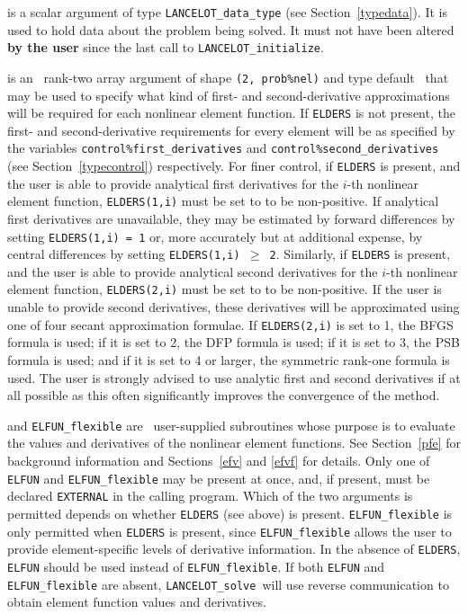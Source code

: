\documentclass{galahad}
\newcommand{\fullpackagename}{LANC\-E\-LOT}
\newcommand{\solver}{{\tt \fullpackagename\_solve}}
\begin{document}
\begin{description}
 is a scalar \intentinout argument of type
{\tt \fullpackagename\_data\_type}
(see Section~\ref{typedata}). It is used to hold data about the problem being
solved. It must not have been altered {\bf by the user} since the last call to
{\tt \fullpackagename\_initialize}.


 is an \optional\ rank-two \intentinout array argument of
shape {\tt (2, prob\%nel)} and type default \integer\,
that may be used to specify what kind of first- and second-derivative
approximations will be required for each nonlinear element function.
If {\tt ELDERS} is not present, the first- and second-derivative
requirements for every element will be as specified by
the variables {\tt control\%first\_derivatives} and
{\tt control\%second\_derivatives} (see Section~\ref{typecontrol})
respectively. For finer control,
if {\tt ELDERS} is present, and the user is able to provide
analytical first derivatives for the $i$-th nonlinear
element function, {\tt ELDERS(1,i)}
must be set to to be non-positive.
If analytical first derivatives are unavailable,
they may be estimated by forward differences by setting
{\tt ELDERS(1,i) = 1} or, more accurately but at additional expense,
by central differences by setting
{\tt ELDERS(1,i) $\geq$ 2}.
Similarly, if {\tt ELDERS} is present, and the user is able to provide
analytical second derivatives for the $i$-th nonlinear
element function, {\tt ELDERS(2,i)}
must be set to to be non-positive.
If the user is unable to provide second derivatives, these
derivatives will be approximated using one of four
secant approximation formulae. If {\tt ELDERS(2,i)} is set to
1, the BFGS formula is used; if it is set to 2, the DFP
formula is used; if it is set to 3, the PSB
formula is used; and if it is set to 4 or larger, the symmetric
rank-one formula is used. The user is strongly advised to
use analytic first and second derivatives
if at all possible as this often
significantly improves the convergence of the method.

 and {\tt ELFUN\_flexible} are \optional\
user-supplied subroutines whose purpose is to
evaluate the values and derivatives of the nonlinear element functions.
See Section~\ref{pfe} for background information and Sections~\ref{efv}
and \ref{efvf} for details.
Only one of {\tt ELFUN} and {\tt ELFUN\_flexible} may be present at once,
and, if present, must be declared {\tt EXTERNAL} in the calling program.
Which of the two arguments is permitted depends on whether {\tt ELDERS}
(see above) is present. {\tt ELFUN\_flexible} is only permitted when
{\tt ELDERS} is present, since {\tt ELFUN\_flexible} allows the user
to provide element-specific levels of derivative information. In the
absence of {\tt ELDERS},  {\tt ELFUN} should be used instead of
{\tt ELFUN\_flexible}.
If both {\tt ELFUN} and {\tt ELFUN\_flexible}
are absent, \solver\ will use reverse communication to
obtain element function values and derivatives.


\end{description}
\end{document}
